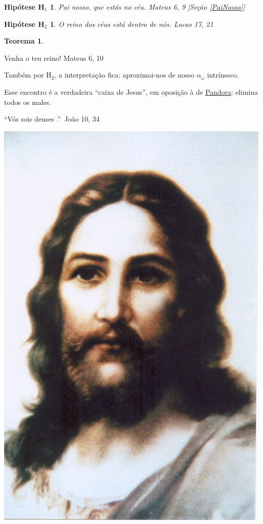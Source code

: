 \documentclass[12pt,a4paper]{article}
\begin{document}
			\newtheorem{H1}{Hip\'otese H$_1$}
			\begin{H1} Pai nosso, que est\'as no c\'eu. Mateus 6, 9 [Se\c{c}\~ao \ref{PaiNosso}]
			\end{H1}

			\newtheorem{H2}{Hip\'otese H$_2$}
			\begin{H2} O reino dos c\'eus est\'a dentro de n\'os. Lucas 17, 21 \cite{perfeicao}
			\end{H2}

			\newtheorem{T}{Teorema}
			\begin{T}
			\end{T}

			Venha o teu reino! Mateus 6, 10

			Tamb\'em por H$_2$, a interpreta\c{c}\~ao fica: aproximai-nos de nosso $ \alpha_\omega $ intr\'inseco\cite{Freud}.

			Esse encontro \'e a verdadeira \textquotedblleft caixa de Jesus\textquotedblright, em oposi\c{c}\~ao \`a de \href{http://en.wikipedia.org/wiki/Pandora\%27s\_box}{Pandora}: elimina todos os males.

			\textquotedblleft V\'os sois deuses \cite{perfeicao}.\textquotedblright\, Jo\~ao 10, 34

			\begin{center}
			\includegraphics[scale=.5]{Cristo}
			\end{center}
\end{document}
